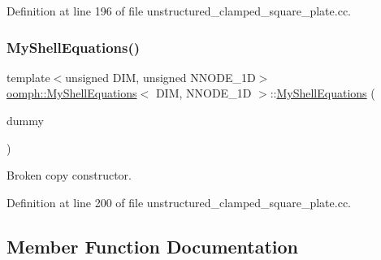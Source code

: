 Definition at line 196 of file unstructured\+\_\+clamped\+\_\+square\+\_\+plate.\+cc.

\mbox{\label{classoomph_1_1MyShellEquations_af92d9d503350b3c84d309b1e70911e27}} 
\subsubsection{\texorpdfstring{My\+Shell\+Equations()}{MyShellEquations()}\hspace{0.1cm}{\footnotesize\ttfamily [2/2]}}
{\footnotesize\ttfamily template$<$unsigned D\+IM, unsigned N\+N\+O\+D\+E\+\_\+1D$>$ \\
\hyperlink{classoomph_1_1MyShellEquations}{oomph\+::\+My\+Shell\+Equations}$<$ D\+IM, N\+N\+O\+D\+E\+\_\+1D $>$\+::\hyperlink{classoomph_1_1MyShellEquations}{My\+Shell\+Equations} (\begin{DoxyParamCaption}\item[{const \hyperlink{classoomph_1_1MyShellEquations}{My\+Shell\+Equations}$<$ D\+IM, N\+N\+O\+D\+E\+\_\+1D $>$ \&}]{dummy }\end{DoxyParamCaption})\hspace{0.3cm}{\ttfamily [inline]}}



Broken copy constructor. 



Definition at line 200 of file unstructured\+\_\+clamped\+\_\+square\+\_\+plate.\+cc.



\subsection{Member Function Documentation}
\mbox{\label{classoomph_1_1MyShellEquations_a72cb38c977990a46780dfedab0fee8b8}} 
